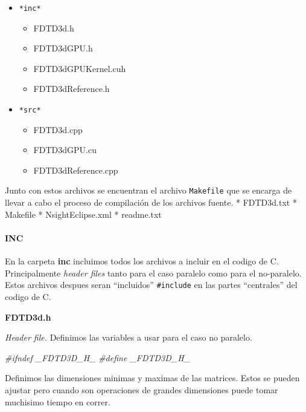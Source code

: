 \documentclass[]{article}
\newenvironment{Shaded}{\begin{snugshade}}{\end{snugshade}}
\newcommand{\PreprocessorTok}[1]{\textcolor[rgb]{0.56,0.35,0.01}{\textit{{#1}}}}
\providecommand{\tightlist}{%
  \setlength{\itemsep}{0pt}\setlength{\parskip}{0pt}}
\let\oldparagraph\paragraph
\renewcommand{\paragraph}[1]{\oldparagraph{#1}\mbox{}}
\begin{document}
\begin{itemize}
\tightlist
\item
  \texttt{*inc*}

  \begin{itemize}
  \tightlist
  \item
    FDTD3d.h
  \item
    FDTD3dGPU.h
  \item
    FDTD3dGPUKernel.cuh
  \item
    FDTD3dReference.h
  \end{itemize}
\item
  \texttt{*src*}

  \begin{itemize}
  \tightlist
  \item
    FDTD3d.cpp
  \item
    FDTD3dGPU.cu
  \item
    FDTD3dReference.cpp
  \end{itemize}
\end{itemize}

Junto con estos archivos se encuentran el archivo \texttt{Makefile} que
se encarga de llevar a cabo el proceso de compilación de los archivos
fuente. * FDTD3d.txt * Makefile * NsightEclipse.xml * readme.txt

\paragraph{INC}\label{inc}

En la carpeta \textbf{inc} incluimos todos los archivos a incluir en el
codigo de C. Principalmente \emph{header files} tanto para el caso
paralelo como para el no-paralelo. Estos archivos despues seran
``incluidos'' \texttt{\#include} en las partes ``centrales'' del codigo
de C.

\textbf{FDTD3d.h}

\emph{Header file.} Definimos las variables a usar para el caso no
paralelo.

\begin{Shaded}
\begin{Highlighting}[]
\PreprocessorTok{#ifndef _FDTD3D_H_}
\PreprocessorTok{#define _FDTD3D_H_}
\end{Highlighting}
\end{Shaded}

Definimos las dimensiones minimas y maximas de las matrices. Estos se
pueden ajustar pero cuando son operaciones de grandes dimensiones puede
tomar muchisimo tiempo en correr.
\end{document}
